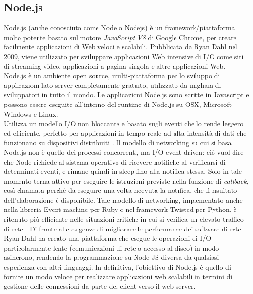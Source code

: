 \subsection{Node.js}
\label{sec:nodejs}
Node.js (anche conosciuto come Node o Nodejs) è un framework/piattaforma molto potente basato sul motore \textit{JavaScript V8} di Google Chrome, per creare facilmente applicazioni di Web veloci e scalabili. Pubblicata da Ryan Dahl nel 2009, viene utilizzato per sviluppare applicazioni Web intensive di I/O come siti di streaming video, applicazioni a pagina singola e altre applicazioni Web. Node.js è un ambiente open source, multi-piattaforma per lo sviluppo di applicazioni lato server completamente gratuito, utilizzato da migliaia di sviluppatori in tutto il mondo. Le applicazioni Node.js sono scritte in Javascript e possono essere eseguite all'interno del runtime di Node.js su OSX, Microsoft Windows e Linux. 
\\Utilizza un modello I/O non bloccante e basato sugli eventi che lo rende leggero ed efficiente, perfetto per applicazioni in tempo reale ad alta intensità di dati che funzionano su dispositivi distribuiti \cite{node:wiki}. Il modello di networking su cui si basa Node.js non è quello dei processi concorrenti, ma I/O event-driven: ciò vuol dire che Node richiede al sistema operativo di ricevere notifiche al verificarsi di determinati eventi, e rimane quindi in sleep fino alla notifica stessa. Solo in tale momento torna attivo per eseguire le istruzioni previste nella funzione di \textit{callback}, così chiamata perché da eseguire una volta ricevuta la notifica, che il risultato dell'elaborazione è disponibile. Tale modello di networking, implementato anche nella libreria Event machine per Ruby e nel framework Twisted per Python, è ritenuto più efficiente nelle situazioni critiche in cui si verifica un elevato traffico di rete \cite{node:wiki}. Di fronte alle esigenze di migliorare le performance dei software di rete Ryan Dahl ha creato una piattaforma che esegue le operazioni di I/O particolarmente lente (comunicazioni di rete o accesso al disco) in modo asincrono, rendendo la programmazione su Node JS diversa da qualsiasi esperienza con altri linguaggi. In definitiva, l'obiettivo di Node.js è quello di fornire un modo veloce per realizzare applicazioni web scalabili in termini di gestione delle connessioni da parte dei client verso il web server.
